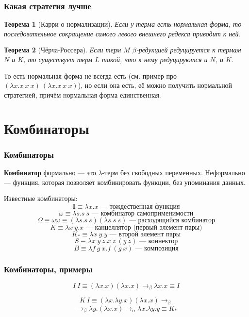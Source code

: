\documentclass[xetex,mathserif,serif]{beamer}
\newtheorem{rustheorem}{Теорема}
\begin{document}
	\begin{frame}
		\frametitle{Какая стратегия лучше}
		\begin{rustheorem}[Карри о нормализации]
			Если у терма есть нормальная форма, то последовательное сокращение самого левого внешнего 
			редекса приводит к ней.
		\end{rustheorem}
		\begin{rustheorem}[Чёрча-Россера]
			Если терм $M$ $\beta$-редукцией редуцируется к термам $N$ и $K$, то существует терм $L$ такой, что
			к нему редуцируются и $N$, и $K$.
		\end{rustheorem}
		То есть нормальная форма не всегда есть (см. пример про $(\lambda x.x\ x\ x)\ (\lambda x.x\ x\ x)$), но
		если она есть, её можно получить нормальной стратегией, причём нормальная форма единственная.
	\end{frame}

	\section{Комбинаторы}

	\begin{frame}
		\frametitle{Комбинаторы}
		\textbf{Комбинатор} формально --- это $\lambda$-терм без свободных переменных. Неформально --- функция,
		которая позволяет комбинировать функции, без упоминания данных.
		
		Известные комбинаторы:
		$$\textbf{I} \equiv \lambda x.x \mbox{ --- тождественная функция}$$
		$$\omega \equiv \lambda s.s\ s \mbox{ --- комбинатор самоприменимости}$$
		$$\Omega \equiv \omega\omega \equiv (\lambda s.s\ s) (\lambda s.s\ s) \mbox{ --- расходящийся комбинатор}$$
		$$K \equiv \lambda x\ y.x \mbox{ --- канцеллятор (первый элемент пары)}$$
		$$K_\ast \equiv \lambda x\ y.y \mbox{ --- второй элемент пары}$$
		$$S \equiv \lambda x\ y\ z. x\ z\ (y\ z) \mbox{ --- коннектор}$$
		$$B \equiv \lambda f\ g\ x. f\ (g\ x) \mbox{ --- композиция}$$		
	\end{frame}
	
	\begin{frame}
		\frametitle{Комбинаторы, примеры}
		$$I\ I \equiv (\lambda x.x) (\lambda x.x) \rightarrow_\beta \lambda x.x \equiv I$$		
				
		$$K\ I \equiv (\lambda x.\lambda y.x) (\lambda x.x) \rightarrow_\beta $$		
		$$\rightarrow_\beta \lambda y.(\lambda x.x) \rightarrow_\alpha \lambda x.\lambda y.y \equiv K_\ast$$		
	\end{frame}
\end{document}
